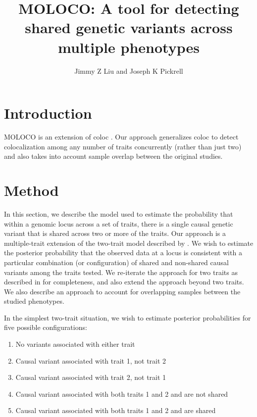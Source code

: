 \documentclass{article}
\begin{document}
\title{MOLOCO: A tool for detecting shared genetic variants across multiple phenotypes}
\author{Jimmy Z Liu and Joseph K Pickrell}
\maketitle


\section{Introduction}
MOLOCO is an extension of coloc \citep{Giambartolomei:2014aa}. Our approach generalizes coloc to detect colocalization among any number of traits concurrently (rather than just two) and also takes into account sample overlap between the original studies.


\section{Method}

In this section, we describe the model used to estimate the probability that within a genomic locus across a set of traits, there is a single causal genetic variant that is shared across two or more of the traits. Our approach is a multiple-trait extension of the two-trait model described by \cite{Giambartolomei:2014aa}. We wish to estimate the posterior probability that the observed data at a locus is consistent with a particular combination (or configuration) of shared and non-shared causal variants among the traits tested. We re-iterate the approach for two traits as described in \cite{Giambartolomei:2014aa} for completeness, and also extend the approach beyond two traits. We also describe an approach to account for overlapping samples between the studied phenotypes.

In the simplest two-trait situation, we wish to estimate posterior probabilities for five possible configurations:
\begin{enumerate}[start=0]
  \item No variants associated with either trait
  \item Causal variant associated with trait 1, not trait 2
  \item Causal variant associated with trait 2, not trait 1
  \item Causal variant associated with both traits 1 and 2 and are not shared
  \item Causal variant associated with both traits 1 and 2 and are shared
\end{enumerate}
\end{document}
